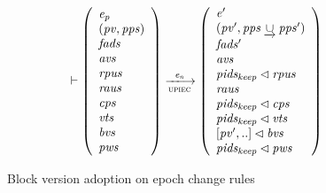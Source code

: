\begin{figure}[htb]
\begin{equation}
{{\begin{array}{l}
        \end{array}
      }
      \vdash
      {
        \left(
          \begin{array}{l}
            \var{e_p}\\
            \var{(\var{pv}, \var{pps})}\\
            \var{fads}\\
            \var{avs}\\
            \var{rpus}\\
            \var{raus}\\
            \var{cps}\\
            \var{vts}\\
            \var{bvs}\\
            \var{pws}
          \end{array}
        \right)
      }
      \trans{upiec}{\var{e_n}}
      {
        \left(
          \begin{array}{l}
            \var{e'}\\
            \var{(\var{pv'}, \var{pps} \unionoverrideRight \var{pps'})}\\
            \var{fads'}\\
            \var{avs}\\
            \var{pids_{keep}} \restrictdom \var{rpus}\\
            \var{raus}\\
            \var{pids_{keep}} \restrictdom \var{cps}\\
            \var{pids_{keep}} \restrictdom \var{vts}\\
            {[\var{pv'}, ..]} \restrictdom \var{bvs}\\
            \var{pids_{keep}} \restrictdom \var{pws}
          \end{array}
        \right)
      }
    }
  \end{equation}
  \caption{Block version adoption on epoch change rules}
  \label{fig:rules:upi-ec}
\end{figure}


